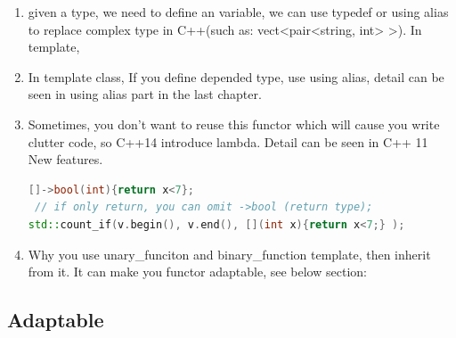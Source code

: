 \documentclass[a4paper,11pt,twoside]{book}
\begin{document}
\begin{enumerate}
\item given a type, we need to define an variable, we can use typedef or using alias to replace complex type in C++(such as: vect<pair<string, int> >). In template,
\item In template class, If you define depended type, use using alias, detail can be seen in using alias part in the last chapter.

\item Sometimes, you don't want to reuse this functor which will cause you write clutter code, so C++14 introduce lambda.  Detail can be seen in C++ 11 New features.
\begin{lstlisting}[frame=single, language=c++]
 []->bool(int){return x<7};
 // if only return, you can omit ->bool (return type);
std::count_if(v.begin(), v.end(), [](int x){return x<7;} );
\end{lstlisting}

\item Why you use  unary\_funciton and binary\_function template, then inherit from it.  It can make you functor adaptable, see below section:
\end{enumerate}

\subsection{Adaptable}
\end{document}
